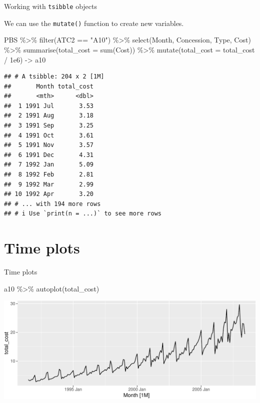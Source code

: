 \documentclass[14pt,ignorenonframetext,aspectratio=169]{beamer}
\newenvironment{Shaded}{\begin{snugshade}}{\end{snugshade}}
\newcommand{\AttributeTok}[1]{\textcolor[rgb]{0.77,0.63,0.00}{#1}}
\newcommand{\FloatTok}[1]{\textcolor[rgb]{0.00,0.00,0.81}{#1}}
\newcommand{\FunctionTok}[1]{\textcolor[rgb]{0.00,0.00,0.00}{#1}}
\newcommand{\NormalTok}[1]{#1}
\newcommand{\OtherTok}[1]{\textcolor[rgb]{0.56,0.35,0.01}{#1}}
\newcommand{\SpecialCharTok}[1]{\textcolor[rgb]{0.00,0.00,0.00}{#1}}
\newcommand{\StringTok}[1]{\textcolor[rgb]{0.31,0.60,0.02}{#1}}
\renewenvironment{Shaded}{\color{black}\begin{snugshade}\color{black}}{\end{snugshade}}
\renewenvironment{Shaded}{\color{black}\fontsize{10}{10}\sf\begin{snugshade}\color{black}}{\end{snugshade}}
\begin{document}
\begin{frame}[fragile]{Working with \texttt{tsibble} objects}
\protect\hypertarget{working-with-tsibble-objects-5}{}
\fontsize{12}{14}\sf

We can use the \texttt{mutate()} function to create new variables.

\fontsize{8}{10}\sf

\begin{Shaded}
\begin{Highlighting}[]
\NormalTok{PBS }\SpecialCharTok{\%\textgreater{}\%}
  \FunctionTok{filter}\NormalTok{(ATC2 }\SpecialCharTok{==} \StringTok{"A10"}\NormalTok{) }\SpecialCharTok{\%\textgreater{}\%}
  \FunctionTok{select}\NormalTok{(Month, Concession, Type, Cost) }\SpecialCharTok{\%\textgreater{}\%}
  \FunctionTok{summarise}\NormalTok{(}\AttributeTok{total\_cost =} \FunctionTok{sum}\NormalTok{(Cost)) }\SpecialCharTok{\%\textgreater{}\%}
  \FunctionTok{mutate}\NormalTok{(}\AttributeTok{total\_cost =}\NormalTok{ total\_cost }\SpecialCharTok{/} \FloatTok{1e6}\NormalTok{) }\OtherTok{{-}\textgreater{}}\NormalTok{ a10}
\end{Highlighting}
\end{Shaded}

\begin{verbatim}
## # A tsibble: 204 x 2 [1M]
##       Month total_cost
##       <mth>      <dbl>
##  1 1991 Jul       3.53
##  2 1991 Aug       3.18
##  3 1991 Sep       3.25
##  4 1991 Oct       3.61
##  5 1991 Nov       3.57
##  6 1991 Dec       4.31
##  7 1992 Jan       5.09
##  8 1992 Feb       2.81
##  9 1992 Mar       2.99
## 10 1992 Apr       3.20
## # ... with 194 more rows
## # i Use `print(n = ...)` to see more rows
\end{verbatim}
\end{frame}

\hypertarget{time-plots}{%
\section{Time plots}\label{time-plots}}

\begin{frame}[fragile]{Time plots}
\protect\hypertarget{time-plots-1}{}
\fontsize{10}{10}\sf

\begin{Shaded}
\begin{Highlighting}[]
\NormalTok{a10 }\SpecialCharTok{\%\textgreater{}\%}
  \FunctionTok{autoplot}\NormalTok{(total\_cost)}
\end{Highlighting}
\end{Shaded}

\includegraphics{2-tsgraphics_files/figure-beamer/unnamed-chunk-3-1.pdf}
\end{frame}
\end{document}
